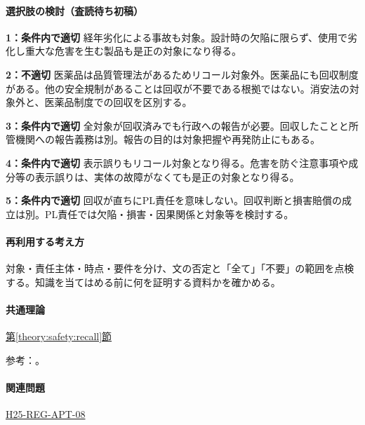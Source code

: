 \paragraph{選択肢の検討（査読待ち初稿）}\mbox{}\par

\noindent\textbf{1：条件内で適切} 経年劣化による事故も対象。設計時の欠陥に限らず、使用で劣化し重大な危害を生む製品も是正の対象になり得る。\par

\noindent\textbf{2：不適切} 医薬品は品質管理法があるためリコール対象外。医薬品にも回収制度がある。他の安全規制があることは回収が不要である根拠ではない。消安法の対象外と、医薬品制度での回収を区別する。\par

\noindent\textbf{3：条件内で適切} 全対象が回収済みでも行政への報告が必要。回収したことと所管機関への報告義務は別。報告の目的は対象把握や再発防止にもある。\par

\noindent\textbf{4：条件内で適切} 表示誤りもリコール対象となり得る。危害を防ぐ注意事項や成分等の表示誤りは、実体の故障がなくても是正の対象となり得る。\par

\noindent\textbf{5：条件内で適切} 回収が直ちにPL責任を意味しない。回収判断と損害賠償の成立は別。PL責任では欠陥・損害・因果関係と対象等を検討する。\par

\paragraph{再利用する考え方} 対象・責任主体・時点・要件を分け、文の否定と「全て」「不要」の範囲を点検する。知識を当てはめる前に何を証明する資料かを確かめる。

\paragraph{共通理論} \hyperref[theory:safety:recall]{第\ref*{theory:safety:recall}節}

\par 参考：\cite{saf53_recall2010,saf53_medicine_recall,pl_statute,pl_qa}。

\paragraph{関連問題} \hyperref[q:h25-reg-apt-08]{H25-REG-APT-08}

